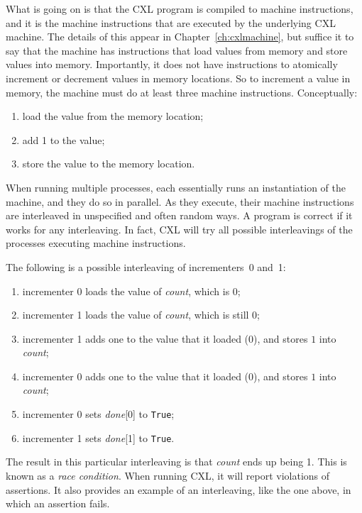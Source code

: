 \documentclass{report}
\begin{document}

What is going on is that the CXL program is compiled to machine instructions,
and it is the machine instructions that are executed by the underlying CXL
machine.  The details of this appear in Chapter~\ref{ch:cxlmachine},
but suffice it to
say that the machine has instructions that load values from memory and store
values into memory.  Importantly, it does not have instructions to atomically
increment or decrement values in memory locations.
So to increment a value in memory,
the machine must do at least three machine instructions.  Conceptually:
\begin{enumerate}
\item load the value from the memory location;
\item add 1 to the value;
\item store the value to the memory location.
\end{enumerate}

When running multiple processes, each essentially runs an instantiation of
the machine, and they do so in parallel.  As they execute, their machine
instructions are interleaved
in unspecified and often random ways.
A program is correct if it works for any interleaving.
In fact, CXL will try all possible interleavings of the processes
executing machine instructions.

The following is a possible interleaving of incrementers~0 and~1:
\begin{enumerate}
\item incrementer 0 loads the value of \textit{count}, which is 0;
\item incrementer 1 loads the value of \textit{count}, which is still 0;
\item incrementer 1 adds one to the value that it loaded (0), and
stores $1$ into \textit{count};
\item incrementer 0 adds one to the value that it loaded (0), and
stores $1$ into \textit{count};
\item incrementer 0 sets \textit{done}[0] to \texttt{True};
\item incrementer 1 sets \textit{done}[1] to \texttt{True}.
\end{enumerate}

The result in this particular interleaving is that \textit{count} ends up
being 1.
This is known as a \emph{race condition}.
When running CXL, it will
report violations of assertions.  It also provides an example
of an interleaving, like the one above, in which an assertion fails.
\end{document}
